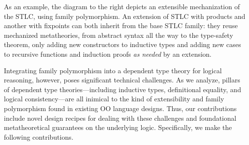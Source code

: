 As an example, the diagram to the right depicts an extensible
mechanization of the \ac{STLC}, using family
polymorphism.
An extension of STLC with products and another with fixpoints
can both inherit from the base STLC family:
they reuse mechanized metatheories,
from abstract syntax all the way to the type-safety theorem,
only adding new constructors to inductive types
and adding new cases to recursive functions and induction proofs
\emph{as needed} by an extension.

Integrating family polymorphism into a dependent type theory for
logical reasoning, however, poses significant technical challenges.
As we analyze, pillars of dependent type theories—including
inductive types, definitional equality, and logical consistency—are
all inimical to the kind of extensibility and family polymorphism
found in existing OO language designs.
Thus, our contributions include novel design recipes for dealing with
these challenges and foundational meta\-theoretical guarantees on the
underlying logic.
%
Specifically, we make the following contributions.

\endgroup

